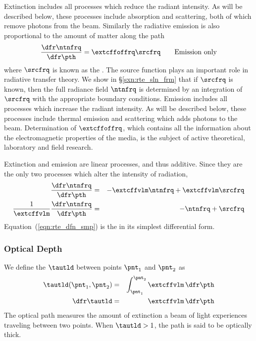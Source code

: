 \documentclass[12pt]{article}
\begin{document}
Extinction includes all processes which reduce the radiant intensity.
As will be described below, these processes include absorption and
scattering, both of which remove photons from the beam.
Similarly the radiative emission is also proportional to the amount
of matter along the path
\begin{equation}
\frac{\dfr\ntnfrq}{\dfr\pth} = \extcffoffrq \srcfrq \qquad\mathrm{Emission\ only}
\label{eqn:msn_dfn}
\end{equation}
where $\srcfrq$ is known as the .
The source function plays an important role in radiative transfer
theory.
We show in \S\ref{sxn:rte_sln_frm} that if $\srcfrq$ is known, then
the full radiance field $\ntnfrq$ is determined by an integration of
$\srcfrq$ with the appropriate boundary conditions. 
Emission includes all processes which increase the radiant intensity.
As will be described below, these processes include thermal emission and
scattering which adds photons to the beam.
Determination of $\extcffoffrq$, which contains all the
information about the electromagnetic properties of the media, is the
subject of active theoretical, laboratory and field research. 

Extinction and emission are linear processes, and thus additive. 
Since they are the only two processes which alter the intensity of
radiation,
\begin{eqnarray}
\frac{\dfr\ntnfrq}{\dfr\pth} & = & -\extcffvlm \ntnfrq + \extcffvlm \srcfrq \nonumber \\
\frac{1}{\extcffvlm} \frac{\dfr\ntnfrq}{\dfr\pth} & = & -\ntnfrq + \srcfrq
\label{eqn:rte_dfn_smp}
\end{eqnarray}
Equation~(\ref{eqn:rte_dfn_smp}) is the  in its simplest differential form.

\subsubsection[Optical Depth]{Optical Depth}\label{sxn:tau}
We define the  $\tautld$ between
points $\pnt_{1}$ and $\pnt_{2}$ as
\begin{eqnarray}
\tautld(\pnt_{1},\pnt_{2}) & = & \int_{\pnt_{1}}^{\pnt_{2}} \extcffvlm \,\dfr\pth
\nonumber \\ 
\dfr\tautld & = & \extcffvlm \,\dfr\pth
\label{eqn:tau_tld_dfn}
\end{eqnarray}
The optical path measures the amount of extinction a beam of light
experiences traveling between two points.
When $\tautld > 1$, the path is said to be optically thick.
\end{document}
